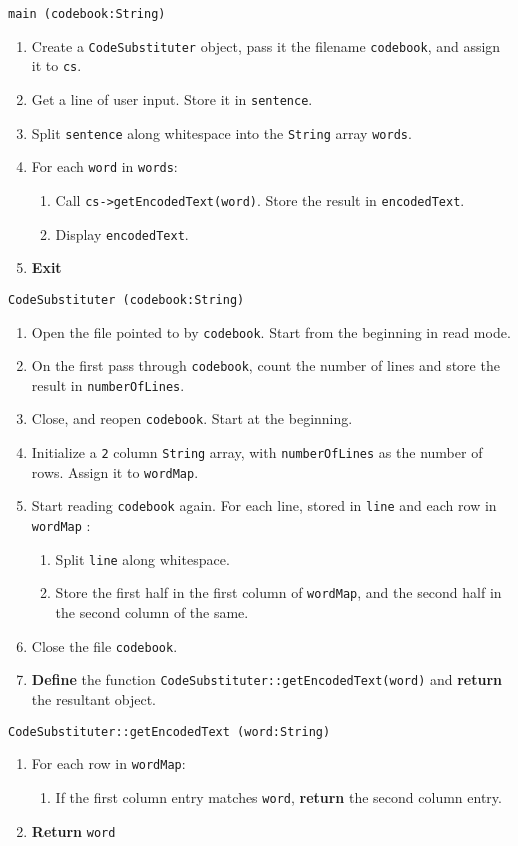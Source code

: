 \algorithm
\texttt{main (codebook:String)}
\begin{enumerate}
	\item Create a \texttt{CodeSubstituter} object, pass it the filename \texttt{codebook}, and assign it
		to \texttt{cs}.
	\item Get a line of user input. Store it in \texttt{sentence}.
	\item Split \texttt{sentence} along whitespace into the \texttt{String} array \texttt{words}.
	\item For each \texttt{word} in \texttt{words}:
	\begin{enumerate}
		\item Call \texttt{cs->getEncodedText(word)}. Store the result in \texttt{encodedText}.
		\item Display \texttt{encodedText}. 
	\end{enumerate}
	\item \textbf{Exit} 
\end{enumerate}
\vspace{8mm}
\texttt{CodeSubstituter (codebook:String)}
\begin{enumerate}
	\item Open the file pointed to by \texttt{codebook}. Start from the beginning in read mode.
	\item On the first pass through \texttt{codebook}, count the number of lines and store the result in \texttt{numberOfLines}.
	\item Close, and reopen \texttt{codebook}. Start at the beginning.
	\item Initialize a \texttt{2} column \texttt{String} array, with \texttt{numberOfLines} as the number of rows. Assign it
		to \texttt{wordMap}. 
	\item Start reading \texttt{codebook} again. For each line, stored in \texttt{line} and each row in \texttt{wordMap} :
	\begin{enumerate}
		\item Split \texttt{line} along whitespace.
		\item Store the first half in the first column of \texttt{wordMap}, and the second half in the second column
			of the same.
	\end{enumerate}
	\item Close the file \texttt{codebook}.
	\item \textbf{Define} the function \texttt{CodeSubstituter::getEncodedText(word)} and \textbf{return} the resultant object.
\end{enumerate}
\vspace{5mm}
\texttt{CodeSubstituter::getEncodedText (word:String)}
\begin{enumerate}
	\item For each row in \texttt{wordMap}:
	\begin{enumerate}
		\item If the first column entry matches \texttt{word}, \textbf{return} the second column entry. 
	\end{enumerate}
	\item \textbf{Return} \texttt{word} 
\end{enumerate}

